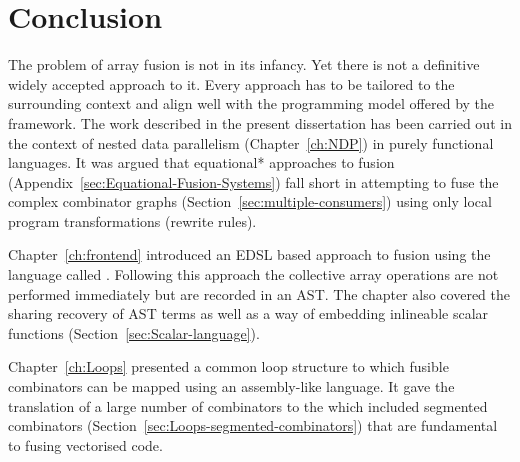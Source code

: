 \documentclass[preamble.tex]{subfiles}
\begin{document}
\clearpage

\chapter{Conclusion}

The problem of array fusion is not in its infancy. Yet there is not a definitive widely accepted approach to it. Every approach has to be tailored to the surrounding context and align well with the programming model offered by the framework. The work described in the present dissertation has been carried out in the context of nested data parallelism (Chapter~\ref{ch:NDP}) in purely functional languages. It was argued that \*equational* approaches to fusion (Appendix~\ref{sec:Equational-Fusion-Systems}) fall short in attempting to fuse the complex combinator graphs (Section~\ref{sec:multiple-consumers}) using only local program transformations (rewrite rules).

Chapter~\ref{ch:frontend} introduced an EDSL based approach to fusion using the language called \LiveFusion. Following this approach the collective array operations are not performed immediately but are recorded in an AST. The chapter also covered the sharing recovery of AST terms as well as a way of embedding inlineable scalar functions (Section~\ref{sec:Scalar-language}).

Chapter~\ref{ch:Loops} presented a common loop structure to which fusible combinators can be mapped using an assembly-like \Loop language. It gave the translation of a large number of combinators to the \Loop which included segmented combinators (Section~\ref{sec:Loops-segmented-combinators}) that are fundamental to fusing vectorised code. 


\IfNotCompilingAll{}
\end{document}
